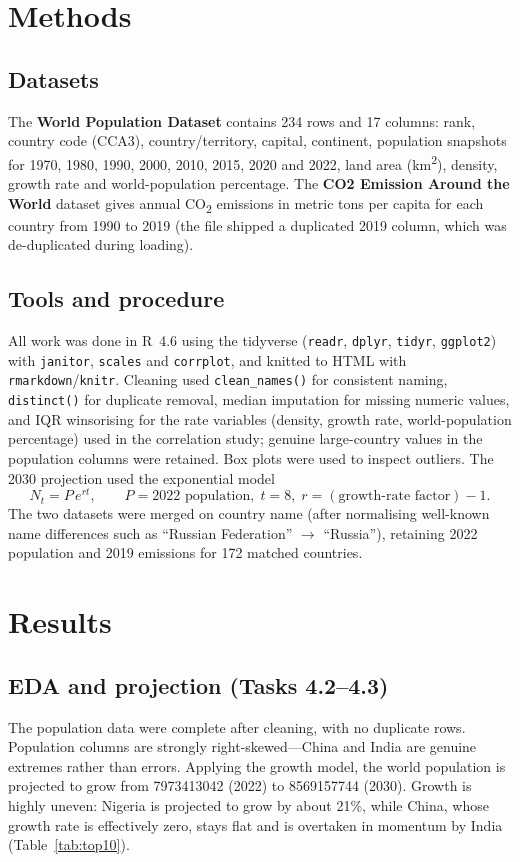 \documentclass[11pt]{article}
\begin{document}
\section{Methods}
\subsection{Datasets}
The \textbf{World Population Dataset} contains 234 rows and 17 columns: rank,
country code (CCA3), country/territory, capital, continent, population snapshots
for 1970, 1980, 1990, 2000, 2010, 2015, 2020 and 2022, land area
(km\textsuperscript{2}), density, growth rate and world-population percentage.
The \textbf{CO2 Emission Around the World} dataset gives annual CO\textsubscript{2}
emissions in metric tons per capita for each country from 1990 to 2019 (the file
shipped a duplicated 2019 column, which was de-duplicated during loading).

\subsection{Tools and procedure}
All work was done in R~4.6 using the tidyverse (\texttt{readr}, \texttt{dplyr},
\texttt{tidyr}, \texttt{ggplot2}) with \texttt{janitor}, \texttt{scales} and
\texttt{corrplot}, and knitted to HTML with \texttt{rmarkdown}/\texttt{knitr}.
Cleaning used \texttt{clean\_names()} for consistent naming,
\texttt{distinct()} for duplicate removal, median imputation for missing numeric
values, and IQR winsorising for the rate variables (density, growth rate,
world-population percentage) used in the correlation study; genuine large-country
values in the population columns were retained. Box plots were used to inspect
outliers. The 2030 projection used the exponential model
\[
N_t = P\,e^{rt},\qquad P = \text{2022 population},\; t = 8,\;
r = (\text{growth-rate factor}) - 1 .
\]
The two datasets were merged on country name (after normalising well-known name
differences such as ``Russian Federation'' $\rightarrow$ ``Russia''), retaining
2022 population and 2019 emissions for 172 matched countries.

\section{Results}
\subsection{EDA and projection (Tasks 4.2--4.3)}
The population data were complete after cleaning, with no duplicate rows.
Population columns are strongly right-skewed---China and India are genuine
extremes rather than errors. Applying the growth model, the world population is
projected to grow from \num{7973413042} (2022) to \num{8569157744} (2030). Growth
is highly uneven: Nigeria is projected to grow by about 21\%, while China, whose
growth rate is effectively zero, stays flat and is overtaken in momentum by India
(Table~\ref{tab:top10}).
\end{document}

